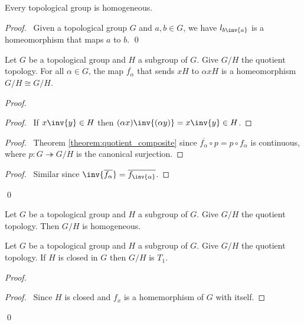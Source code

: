 \begin{corollary}
    Every topological group is homogeneous.
\end{corollary}

\begin{proof}
    \pf\ Given a topological group $G$ and $a, b \in G$, we have $l_{b\inv{a}}$
    is a homeomorphism that maps $a$ to $b$. \qed
\end{proof}

\begin{proposition}
    Let $G$ be a topological group and $H$ a subgroup of $G$. Give $G / H$
    the quotient topology. For all $\alpha \in G$, the map $\overline{f_\alpha}$ that
    sends $xH$ to $\alpha xH$ is a homeomorphism $G / H \cong G / H$.    
\end{proposition}

\begin{proof}
    \pf
    \begin{proof}
        \pf\ If $x\inv{y} \in H$ then $(\alpha x) \inv{(\alpha y)} = x \inv{y}
        \in H$.
    \end{proof}
    \begin{proof}
        \pf\ Theorem \ref{theorem:quotient_composite} since $\overline{f_\alpha} \circ p
        = p \circ f_\alpha$ is continuous, where $p : G \twoheadrightarrow G / H$
        is the canonical surjection.
    \end{proof}
    \begin{proof}
        \pf\ Similar since $\inv{\overline{f_\alpha}} = \overline{f_{\inv{\alpha}}}$.
    \end{proof}
    \qed
\end{proof}

\begin{corollary}
    Let $G$ be a topological group and $H$ a subgroup of $G$. Give $G / H$
    the quotient topology. Then $G / H$ is homogeneous.
\end{corollary}

\begin{proposition}
    \label{proposition:T1_quotient}
    Let $G$ be a topological group and $H$ a subgroup of $G$. Give $G / H$
    the quotient topology. If $H$ is closed in $G$ then $G / H$ is $T_1$.
\end{proposition}

\begin{proof}
    \pf
    \begin{proof}
        \pf\ Since $H$ is closed and $f_x$ is a homemorphism of $G$ with
        itself.
    \end{proof}
    \qed
\end{proof}

